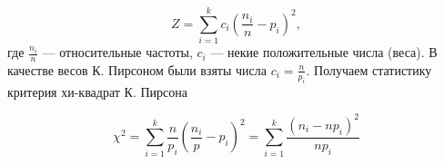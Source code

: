 \documentclass[12pt]{article}
\begin{document}
\begin{equation}
    Z = \sum_{i=1}^{k}c_i \left(\frac{n_i}{n} - p_i\right)^2,
    \label{eq_7:7}
\end{equation}
где $\frac{n_i}{n}$ –– относительные частоты, $c_i$ –– некие положительные числа (веса). В качестве весов К. Пирсоном были взяты числа $c_i = \frac{n}{p_i}$. Получаем статистику критерия хи-квадрат К. Пирсона

\begin{equation}
    \chi^2 = \sum_{i=1}^{k}\frac{n}{p_i} \left(\frac{n_i}{p} - p_i\right)^2 = \sum_{i=1}^{k}\frac{(n_i - np_i)^2}{np_i}
    \label{eq_7:8}
\end{equation}



\end{document}
